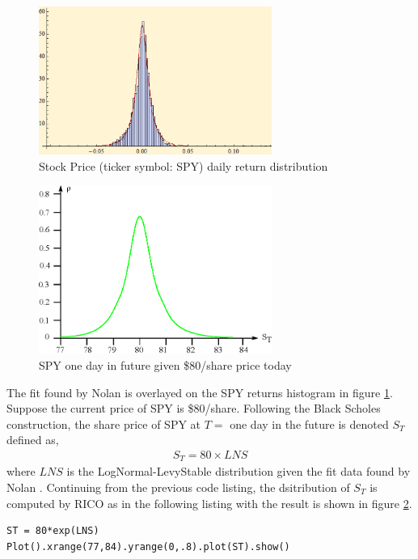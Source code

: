 \begin{figure}
  \centering
  \includegraphics[width=3in]{Images/SPY_returns_fit.eps}
  \caption[Stock Price (ticker symbol: SPY) daily return distribution]
          {Stock Price (ticker symbol: SPY) daily return distribution}
  \label{fig:SPY_returns_fit}
\end{figure}

\begin{figure}
  \centering
  \includegraphics[width=3in]{Images/SPY_purchase.eps}
  \caption[SPY one day in future given \$80/share price today]
          {SPY one day in future given \$80/share price today}
  \label{fig:SPY_purchase}
\end{figure}

The fit found by Nolan \cite{nolan13} is overlayed on the SPY returns histogram in figure \ref{fig:SPY_returns_fit}. Suppose the current price of SPY is \$80/share. Following the Black Scholes construction, the share price of SPY at $T = $ one day in the future is denoted $S_T$ defined as,
\begin{align*}
S_T = 80 \times LNS
\end{align*}
where $LNS$ is the LogNormal-LevyStable distribution given the fit data found by Nolan \cite{nolan13}. Continuing from the previous code listing, the dsitribution of $S_T$ is computed by RICO as in the following listing with the result is shown in figure \ref{fig:SPY_purchase}.
\begin{lstlisting}
ST = 80*exp(LNS)
Plot().xrange(77,84).yrange(0,.8).plot(ST).show()
\end{lstlisting}

